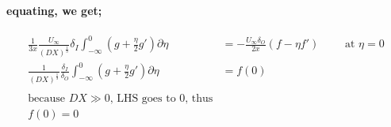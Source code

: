 \documentclass[11pt]{amsart}
\begin{document}
\paragraph{equating, we get;}
\begin{align}
\frac{1}{3x} \frac{U_\infty}{(DX)^\frac{1}{3}} \delta_I \int_{-\infty}^0 (g +\frac{\eta}{2}g') \partial \eta & = - \frac{U_\infty \delta_O}{2x}(f-\eta f') \qquad \text{  at   } \eta=0 \nonumber \\
\frac{1}{(DX)^\frac{1}{3}}\frac{\delta_I}{\delta_O} \int_{-\infty}^0 (g +\frac{\eta}{2}g') \partial \eta & = f(0) \nonumber \\ \nonumber \\
\text{because \(DX \gg 0\), LHS goes to 0, thus} \nonumber \\
f(0) = 0 \nonumber \\ \nonumber
\end{align}
\end{document}
